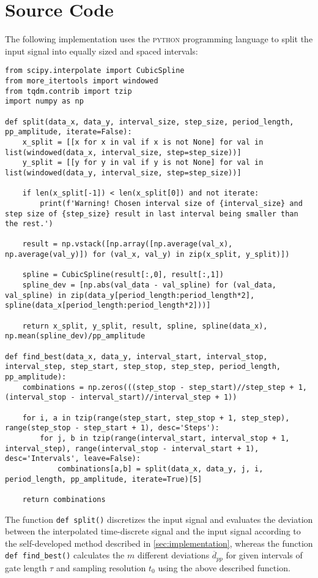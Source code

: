 \section{Source Code}
The following implementation uses the \textsc{python} programming language to split the input signal into equally sized and spaced intervals:
\begin{verbatim}
from scipy.interpolate import CubicSpline
from more_itertools import windowed
from tqdm.contrib import tzip
import numpy as np

def split(data_x, data_y, interval_size, step_size, period_length, pp_amplitude, iterate=False):
	x_split = [[x for x in val if x is not None] for val in list(windowed(data_x, interval_size, step=step_size))]
	y_split = [[y for y in val if y is not None] for val in list(windowed(data_y, interval_size, step=step_size))]

	if len(x_split[-1]) < len(x_split[0]) and not iterate:
		print(f'Warning! Chosen interval size of {interval_size} and step size of {step_size} result in last interval being smaller than the rest.')

	result = np.vstack([np.array([np.average(val_x), np.average(val_y)]) for (val_x, val_y) in zip(x_split, y_split)])

	spline = CubicSpline(result[:,0], result[:,1])
	spline_dev = [np.abs(val_data - val_spline) for (val_data, val_spline) in zip(data_y[period_length:period_length*2], spline(data_x[period_length:period_length*2]))]

	return x_split, y_split, result, spline, spline(data_x), np.mean(spline_dev)/pp_amplitude

def find_best(data_x, data_y, interval_start, interval_stop, interval_step, step_start, step_stop, step_step, period_length, pp_amplitude):
	combinations = np.zeros(((step_stop - step_start)//step_step + 1, (interval_stop - interval_start)//interval_step + 1))

	for i, a in tzip(range(step_start, step_stop + 1, step_step), range(step_stop - step_start + 1), desc='Steps'):
		for j, b in tzip(range(interval_start, interval_stop + 1, interval_step), range(interval_stop - interval_start + 1), desc='Intervals', leave=False):
			combinations[a,b] = split(data_x, data_y, j, i, period_length, pp_amplitude, iterate=True)[5]

	return combinations
\end{verbatim}
The function \texttt{def split()} discretizes the input signal and evaluates the deviation between the interpolated time-discrete signal and the input signal according to the self-developed method described in \cref{sec:implementation}, whereas the function \texttt{def find_best()} calculates the $m$ different deviations $\overline{d}_{pp}$ for given intervals of gate length $\tau$ and sampling resolution $t_0$ using the above described function.
